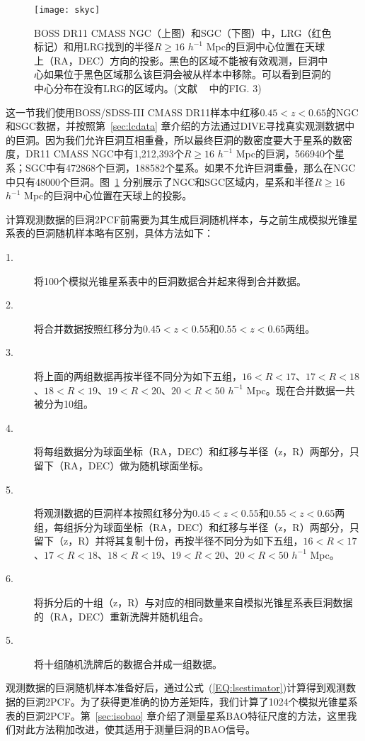 {\begin{figure}
\centering
\texttt{[image: skyc]}
\caption{BOSS DR11 CMASS NGC（上图）和SGC（下图）中，LRG（红色标记）和用LRG找到的半径$R \geq 16$ $h^{-1}$ Mpc的巨洞中心位置在天球上（RA，DEC）方向的投影。黑色的区域不能被有效观测，巨洞中心如果位于黑色区域那么该巨洞会被从样本中移除。可以看到巨洞的中心分布在没有LRG的区域内。(文献 ~ 中的FIG. 3)}
\label{fig:sky}
\end{figure}

这一节我们使用BOSS/SDSS-III CMASS DR11样本中红移$0.45 < z < 0.65$的NGC和SGC数据，并按照第~\ref{sec:lcdata} 章介绍的方法通过DIVE寻找真实观测数据中的巨洞。因为我们允许巨洞互相重叠，所以最终巨洞的数密度要大于星系的数密度，DR11 CMASS NGC中有1,212,393个$R \geq 16$ $h^{-1}$ Mpc的巨洞，566940个星系；SGC中有472868个巨洞，188582个星系。如果不允许巨洞重叠，那么在NGC中只有48000个巨洞。图~\ref{fig:sky} 分别展示了NGC和SGC区域内，星系和半径$R \geq 16$ $h^{-1}$ Mpc的巨洞中心位置在天球上的投影。

计算观测数据的巨洞2PCF前需要为其生成巨洞随机样本，与之前生成模拟光锥星系表的巨洞随机样本略有区别，具体方法如下：
\begin{description}
\item[1.] 将100个模拟光锥星系表中的巨洞数据合并起来得到合并数据。
\item[2.] 将合并数据按照红移分为$0.45 < z < 0.55$和$0.55 < z < 0.65$两组。
\item[3.] 将上面的两组数据再按半径不同分为如下五组，$16<R<17$、$17<R<18$、$18<R<19$、$19<R<20$、$20<R<50$ $h^{-1}$ Mpc。现在合并数据一共被分为10组。
\item[4.] 将每组数据分为球面坐标（RA，DEC）和红移与半径（z，R）两部分，只留下（RA，DEC）做为随机球面坐标。
\item[5.] 将观测数据的巨洞样本按照红移分为$0.45 < z < 0.55$和$0.55 < z < 0.65$两组，每组拆分为球面坐标（RA，DEC）和红移与半径（z，R）两部分，只留下（z，R）并将其复制十份，再按半径不同分为如下五组，$16<R<17$、$17<R<18$、$18<R<19$、$19<R<20$、$20<R<50$ $h^{-1}$ Mpc。
\item[6.] 将拆分后的十组（z，R）与对应的相同数量来自模拟光锥星系表巨洞数据的（RA，DEC）重新洗牌并随机组合。
\item[5.] 将十组随机洗牌后的数据合并成一组数据。
\end{description}

观测数据的巨洞随机样本准备好后，通过公式~(\ref{EQ:lsestimator})计算得到观测数据的巨洞2PCF。为了获得更准确的协方差矩阵，我们计算了1024个模拟光锥星系表的巨洞2PCF。第~\ref{sec:isobao} 章介绍了测量星系BAO特征尺度的方法，这里我们对此方法稍加改进，使其适用于测量巨洞的BAO信号。

}
